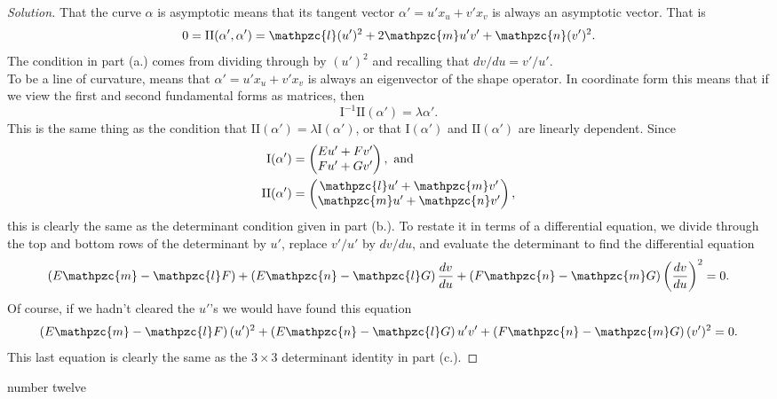 \documentclass[Shifrin_Solutions_Spring_2018]{subfiles}
\begin{document}
\begin{proof}[Solution]
That the curve $\alpha$ is asymptotic means that its tangent vector $\alpha' = u' x_u + v' x_v$ is always an asymptotic vector. That is
\[
0 = \mathrm{II}(\alpha' , \alpha') = \mathpzc{l}(u')^2 + 2\mathpzc{m}u'v' + \mathpzc{n}(v')^2 .
\]
The condition in part (a.) comes from dividing through by $(u')^2$ and recalling that $dv/du = v'/u'$.\\

To be a line of curvature, means that $\alpha' = u'x_u + v'x_v$ is always an eigenvector of  the shape operator. In coordinate form this means that if we view the first and second fundamental forms as matrices, then
\[
\mathrm{I}^{-1}\mathrm{II}(\alpha') = \lambda \alpha' .
\]
This is the same thing as the condition that $\mathrm{II}(\alpha') = \lambda \mathrm{I}(\alpha')$, or that $\mathrm{I}(\alpha')$ and $\mathrm{II}(\alpha')$ are linearly dependent. Since
\begin{align*}
\mathrm{I}(\alpha') & =\begin{pmatrix} Eu' + Fv' \\ F u' + Gv' \end{pmatrix}, \text{ and} \\
\mathrm{II}(\alpha') &  = \begin{pmatrix}\mathpzc{l} u' + \mathpzc{m}v' \\ \mathpzc{m}u' + \mathpzc{n}v' \end{pmatrix} ,
\end{align*}
this is clearly the same as the determinant condition given in part (b.). To restate it in terms of a differential equation, we divide through the top and bottom rows of the determinant by $u'$, replace $v'/u'$ by $dv/du$, and evaluate the determinant to find the differential equation
\[
\left(E\mathpzc{m} - \mathpzc{l}F\right) + \left( E\mathpzc{n} - \mathpzc{l}G\right) \dfrac{dv}{du} + \left( F\mathpzc{n} - \mathpzc{m}G\right) \left( \dfrac{dv}{du}\right)^2 = 0.
\]
Of course, if we hadn't cleared the $u'$'s we would have found this equation
\[
\left(E\mathpzc{m} - \mathpzc{l}F\right)(u')^2 + \left( E\mathpzc{n} - \mathpzc{l}G\right) u'v' + \left( F\mathpzc{n} - \mathpzc{m}G\right) (v')^2 = 0.
\]
This last equation is clearly the same as the $3\times 3$ determinant identity in part (c.).


\end{proof}

\begin{exercise}
number twelve
\end{exercise}
\end{document}
